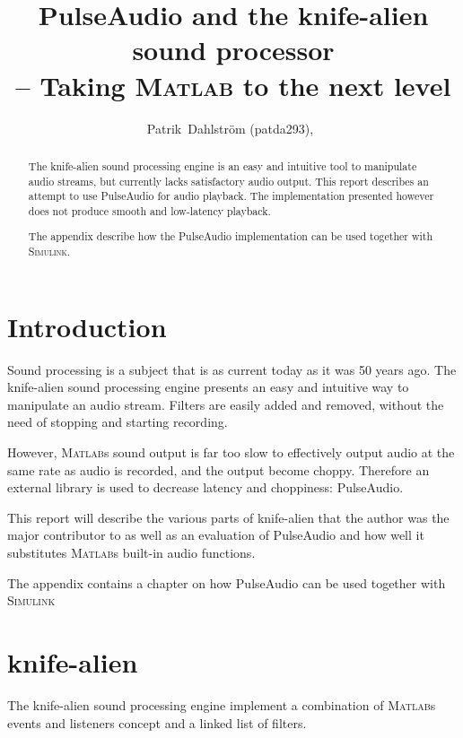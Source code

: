 \documentclass[journal]{IEEEtran}
\begin{document}
\lstset{frame=lines,
        language=Matlab,
        breaklines=true,
        numbers=left,
        numbersep=1pt,
        basicstyle=\tiny}

\title{PulseAudio and the knife-alien sound processor\\
-- Taking \textsc{Matlab} to the next level}
\author{Patrik~Dahlström (patda293),~}

\maketitle

\begin{abstract}
The knife-alien sound processing engine is an easy and intuitive tool to manipulate audio streams, but currently lacks satisfactory audio output. This report describes an attempt to use PulseAudio for audio playback. The implementation presented however does not produce smooth and low-latency playback.

The appendix describe how the PulseAudio implementation can be used together with \textsc{Simulink}.
\end{abstract}

\section*{Introduction}
Sound processing is a subject that is as current today as it was 50 years ago. The knife-alien sound processing engine presents an easy and intuitive way to manipulate an audio stream. Filters are easily added and removed, without the need of stopping and starting recording.

However, \textsc{Matlab}s sound output is far too slow to effectively output audio at the same rate as audio is recorded, and the output become choppy. Therefore an external library is used to decrease latency and choppiness: PulseAudio.

This report will describe the various parts of knife-alien that the author was the major contributor to as well as an evaluation of PulseAudio and how well it substitutes \textsc{Matlab}s built-in audio functions.

The appendix contains a chapter on how PulseAudio can be used together with \textsc{Simulink}

\section{knife-alien}
The knife-alien sound processing engine implement a combination of \textsc{Matlab}s events and listeners concept and a linked list of filters.
\end{document}
